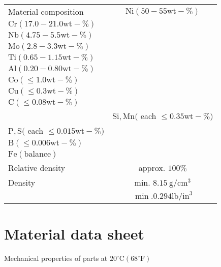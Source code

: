 \documentclass[10pt]{article}
\begin{document}
\begin{center}
\begin{tabular}{lc}
\hline
Material composition & $\mathrm{Ni}(50-55 \mathrm{wt}-\%)$ \\
$\mathrm{Cr}(17.0-21.0 \mathrm{wt}-\%)$ &  \\
$\mathrm{Nb}(4.75-5.5 \mathrm{wt}-\%)$ &  \\
$\mathrm{Mo}(2.8-3.3 \mathrm{wt}-\%)$ &  \\
$\mathrm{Ti}(0.65-1.15 \mathrm{wt}-\%)$ &  \\
$\mathrm{Al}(0.20-0.80 \mathrm{wt}-\%)$ &  \\
$\mathrm{Co}(\leq 1.0 \mathrm{wt}-\%)$ &  \\
$\mathrm{Cu}(\leq 0.3 \mathrm{wt}-\%)$ &  \\
$\mathrm{C}(\leq 0.08 \mathrm{wt}-\%)$ &  \\
 & $\mathrm{Si}, \mathrm{Mn}($ each $\leq 0.35 \mathrm{wt}-\%)$ \\
$\mathrm{P}, \mathrm{S}($ each $\leq 0.015 \mathrm{wt}-\%)$ &  \\
$\mathrm{B}(\leq 0.006 \mathrm{wt}-\%)$ &  \\
$\mathrm{Fe}(\mathrm{balance})$ &  \\
\hline
Relative density & approx. $100 \%$ \\
\hline
Density & min. $8.15 \mathrm{~g} / \mathrm{cm}^{3}$ \\
 & $\min .0 .294 \mathrm{lb} / \mathrm{in}^{3}$ \\
\hline
\end{tabular}
\end{center}

\section*{Material data sheet}
Mechanical properties of parts at $20^{\circ} \mathrm{C}\left(68^{\circ} \mathrm{F}\right)$
\end{document}
